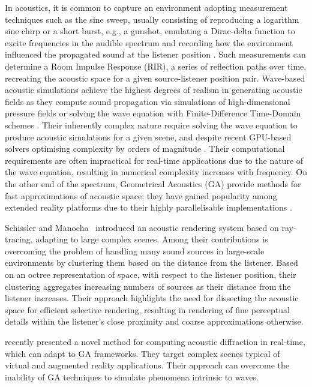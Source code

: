 In acoustics, it is common to capture an environment adopting measurement techniques such as the sine sweep, usually consisting of reproducing a logarithm sine chirp or a short burst, e.g., a gunshot,  emulating a Dirac-delta function to excite frequencies in the audible spectrum and recording how the environment influenced the propagated sound at the listener position \cite{reilly1995convolution}. Such measurements can determine a Room Impulse Response (RIR), a series of reflection paths over time, recreating the acoustic space for a given source-listener position pair. Wave-based acoustic simulations achieve the highest degrees of realism in generating acoustic fields as they compute sound propagation via simulations of high-dimensional pressure fields \cite{raghuvanshi2014parametric} or solving the wave equation with Finite-Difference Time-Domain schemes \cite{hamilton2017fdtd}. Their inherently complex nature require solving the wave equation to produce acoustic simulations for a given scene, and despite recent GPU-based solvers optimising complexity by orders of magnitude \cite{mehra2012efficient}. Their computational requirements are often impractical for real-time applications due to the nature of the wave equation, resulting in numerical complexity increases with frequency. On the other end of the spectrum, Geometrical Acoustics (GA) provide methods for fast approximations of acoustic space; they have gained popularity among extended reality platforms due to their highly parallelisable implementations \cite{savioja2015overview}.\par
Schissler and Manocha~\cite{schissler2016interactive} introduced an acoustic rendering system based on ray-tracing, adapting to large complex scenes. Among their contributions is overcoming the problem of handling many sound sources in large-scale environments by clustering them based on the distance from the listener. Based on an octree representation of space, with respect to the listener position, their clustering aggregates increasing numbers of sources as their distance from the listener increases. Their approach highlights the need for dissecting the acoustic space for efficient selective rendering, resulting in rendering of fine perceptual details within the listener's close proximity and coarse approximations otherwise.\par

\cite{schissler2021fast} recently presented a novel method for computing acoustic diffraction in real-time, which can adapt to GA frameworks. They target complex scenes typical of virtual and augmented reality applications. Their approach can overcome the inability of GA techniques to simulate phenomena intrinsic to waves.\par


